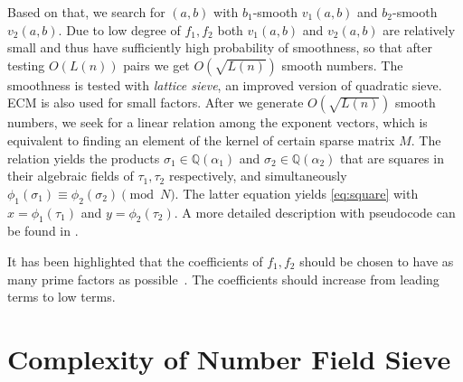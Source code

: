 \documentclass[a4paper]{article}
\begin{document}
Based on that, we search for $(a,b)$ with $b_1$-smooth $v_1(a,b)$ and $b_2$-smooth $v_2(a,b)$. Due to low degree of $f_1,f_2$ both $v_1(a,b)$ and $v_2(a,b)$ are relatively small and thus have sufficiently high probability of smoothness, so that after testing $O(L(n))$ pairs we get $O(\sqrt{L(n)})$ smooth numbers.  The smoothness is tested with \emph{lattice sieve}, an improved version of quadratic sieve. ECM is also used for small factors.  After we generate $O(\sqrt{L(n)})$ smooth numbers, we seek for a linear relation among the exponent vectors, which is equivalent to finding an element of the kernel of certain sparse matrix $M$.  The relation yields the products $\sigma_1\in\mathbb{Q}(\alpha_1) $ and $\sigma_2\in\mathbb{Q}(\alpha_2)$ that are squares in their algebraic fields of $\tau_1,\tau_2$ respectively, and simultaneously $\phi_1(\sigma_1) \equiv \phi_2(\sigma_2)\pmod{N}$. The latter equation yields \eqref{eq:square} with $x=\phi_1(\tau_1)$ and $y=\phi_2(\tau_2)$. 
A more detailed 
description with pseudocode can be found in \cite{winograd2012number}.

It has been highlighted that the coefficients of $f_1,f_2$ should be chosen to have as many prime factors as possible~\cite{DBLP:conf/crypto/KleinjungAFLTBGKMORTZ10}.  The coefficients should increase from leading terms to low terms.


\section{Complexity of Number Field Sieve}
\end{document}
